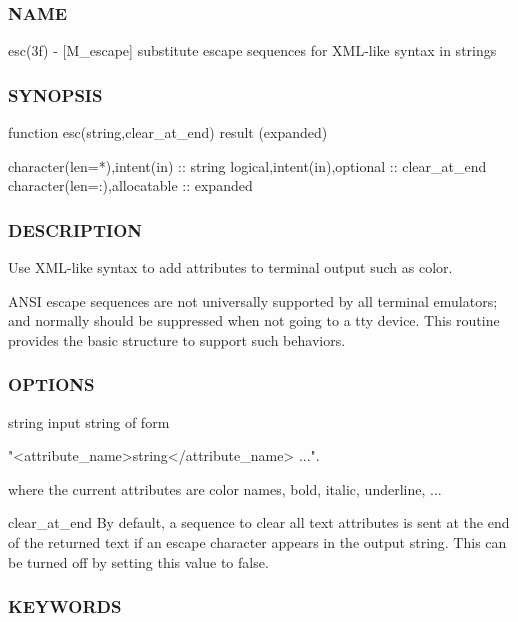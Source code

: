 \subsubsection*{N\+A\+ME}

esc(3f) -\/ \mbox{[}M\+\_\+escape\mbox{]} substitute escape sequences for X\+M\+L-\/like syntax in strings 

\subsubsection*{S\+Y\+N\+O\+P\+S\+IS}

\begin{DoxyVerb} function esc(string,clear_at_end) result (expanded)

   character(len=*),intent(in) :: string
   logical,intent(in),optional :: clear_at_end
   character(len=:),allocatable :: expanded
\end{DoxyVerb}


\subsubsection*{D\+E\+S\+C\+R\+I\+P\+T\+I\+ON}

Use X\+M\+L-\/like syntax to add attributes to terminal output such as color.

A\+N\+SI escape sequences are not universally supported by all terminal emulators; and normally should be suppressed when not going to a tty device. This routine provides the basic structure to support such behaviors.

\subsubsection*{O\+P\+T\+I\+O\+NS}

string input string of form \begin{DoxyVerb}            "<attribute_name>string</attribute_name> ...".

           where the current attributes are color names,
           bold, italic, underline, ...
\end{DoxyVerb}


clear\+\_\+at\+\_\+end By default, a sequence to clear all text attributes is sent at the end of the returned text if an escape character appears in the output string. This can be turned off by setting this value to false. \subsubsection*{K\+E\+Y\+W\+O\+R\+DS}

